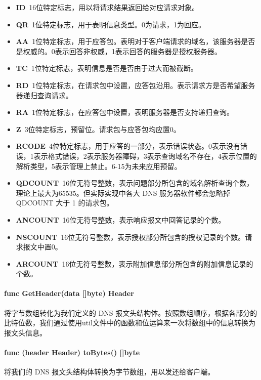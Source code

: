\documentclass[blue,normal,cn]{elegantnote}
\begin{document}
\begin{itemize}
	\item \textbf{ID}\ 16位特定标志，用以将请求结果返回给对应请求对象。
	\item \textbf{QR}\ 1位特定标志，用于表明信息类型。0为请求，1为回应。
	\item \textbf{AA}\ 1位特定标志，用于应答包。表明对于客户端请求的域名，该服务器是否是权威的。0表示回答非权威，1表示回答的服务器是授权服务器。
	\item \textbf{TC}\ 1位特定标志，表明信息是否是否由于过大而被截断。
	\item \textbf{RD}\ 1位特定标志，在请求包中设置，应答包沿用。表示请求方是否希望服务器递归查询请求。
	\item \textbf{RA}\ 1位特定标志，在应答包中设置，表明服务器是否支持递归查询。
	\item \textbf{Z}\ 3位特定标志，预留位。请求包与应答包均应置0。
	\item \textbf{RCODE}\ 4位特定标志，用于应答的一部分，表示错误状态。0表示没有错误，1表示格式错误，2表示服务器障碍，3表示查询域名不存在，4表示位置的解析类型，5表示管理上禁止。6-15为未来应用预留。
	\item \textbf{QDCOUNT}\ 16位无符号整数，表示问题部分所包含的域名解析查询个数，理论上最大为65535。但实际实现中各大 DNS 服务器软件都会忽略掉 QDCOUNT 大于 1 的请求包。
	\item \textbf{ANCOUNT}\ 16位无符号整数，表示响应报文中回答记录的个数。
	\item \textbf{NSCOUNT}\ 16位无符号整数，表示授权部分所包含的授权记录的个数。请求报文中置0。
	\item \textbf{ARCOUNT}\ 16位无符号整数，表示附加信息部分所包含的附加信息记录的个数。
\end{itemize}

\paragraph{func GetHeader(data []byte) Header} 将字节数组转化为我们定义的 DNS 报文头结构体。按照数组顺序，根据各部分的比特位数，我们通过使用util文件中的函数和位运算来一次将数组中的信息转换为报文头信息。

\paragraph{func (header Header) toBytes() []byte} 将我们的 DNS 报文头结构体转换为字节数组，用以发还给客户端。
\end{document}
